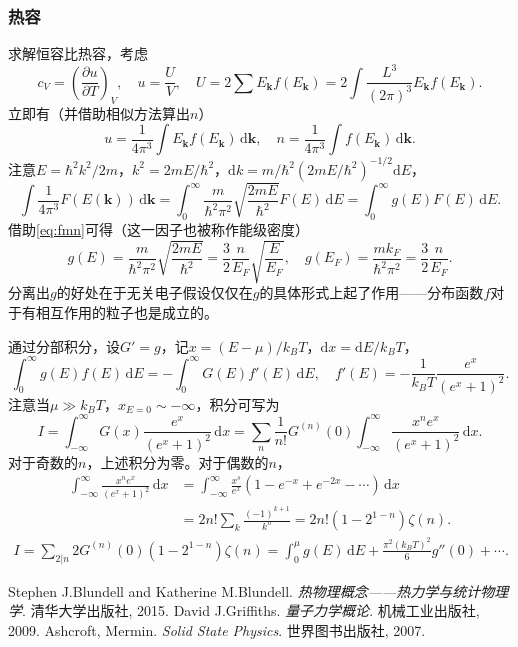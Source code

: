 \documentclass{ctexart}
\newcommand{\ddelon}[2]{\frac{\partial #1}{\partial #2}}
\newcommand{\rd}[1]{\mathrm{d} #1}
\newcommand{\pare}[1]{\left( #1 \right)}
\newcommand{\rec}[1]{\frac{1}{#1}}
\newcommand{\vk}{\boldsymbol{k}}
\newcommand{\fconclu}{\boxed}
\newcommand{\intn}[2]{\int #1 \,\mathrm{d} #2}
\newcommand{\intu}[3]{\int_0^{#1} #2 \,\mathrm{d} #3}
\newcommand{\intui}[2]{\int_0^{\infty} #1 \,\mathrm{d} #2}
\newcommand{\intii}[2]{\int_{-\infty}^{\infty} #1 \,\mathrm{d} #2}
\newcommand{\dn}[2]{#1^{\pare{#2}}}
\begin{document}
\subsubsection{热容}
求解恒容比热容，考虑
\[ c_V = \pare{\ddelon{u}{T}}_V, \quad u=\frac{U}{V}, \quad U = 2 \sum E_{\vk}f\pare{E_{\vk}}= 2 \int \frac{L^3}{\pare{2\pi}^3} E_{\vk}f\pare{E_{\vk}}. \]
立即有（并借助相似方法算出$n$）
\[ u = \rec{4\pi^3}\intn{E_{\vk}f\pare{E_{\vk}}}{\vk}, \quad n = \rec{4\pi^3}\intn{f\pare{E_{\vk}}}{\vk}. \]
注意$E=\hbar^2 k^2/2m$，$k^2=2mE/\hbar^2$，$\rd k = m/\hbar^2\pare{2mE/\hbar^2}^{-1/2}\rd E$，
\[ \intn{\rec{4\pi^3}F\pare{E\pare{\vk}}}{\vk} = \intu{\infty}{\frac{m}{\hbar^2\pi^2}\sqrt{\frac{2mE}{\hbar^2}}F\pare{E}}{E} = \intu{\infty}{g\pare{E}F\pare{E}}{E}. \]
借助\eqref{eq:fmn}可得（这一因子也被称作能级密度）
\[ g\pare{E} = \frac{m}{\hbar^2\pi^2}\sqrt{\frac{2mE}{\hbar^2}} = \frac{3}{2}\frac{n}{E_F}\sqrt{\frac{E}{E_F}},\quad \fconclu{ g\pare{E_F} = \frac{mk_F}{\hbar^2\pi^2} = \frac{3}{2}\frac{n}{E_F}. }  \]
分离出$g$的好处在于无关电子假设仅仅在$g$的具体形式上起了作用——分布函数$f$对于有相互作用的粒子也是成立的。
\par
通过分部积分，设$G'=g$，记$x=\pare{E-\mu}/k_BT$，$\rd x = \rd E/k_BT$，
\[ \intu{\infty}{g\pare{E}f\pare{E}}{E} = -\intui{G\pare{E}f'\pare{E}}{E},\quad f'\pare{E} = -\frac{1}{k_BT}\frac{e^x}{\pare{e^x+1}^2}. \]
注意当$\mu\gg k_BT$，$x_{E=0}\sim-\infty$，积分可写为
\[ I = \intii{G\pare{x}\frac{e^x}{\pare{e^x+1}^2}}{x} = \sum_n \rec{n!}\dn{G}{n}\pare{0}\intii{\frac{x^ne^x}{\pare{e^x+1}^2}}{x}. \]
对于奇数的$n$，上述积分为零。对于偶数的$n$，
\begin{align*}
\intii{\frac{x^ne^x}{\pare{e^x+1}^2}}{x} &= \intii{\frac{x^s}{e^x}\pare{1-e^{-x}+e^{-2x}-\cdots}}{x} \\
&= 2n!\sum_k\frac{\pare{-1}^{k+1}}{k^n} = 2n!\pare{1-2^{1-n}}\zeta\pare{n}.
\end{align*}
\begin{align*}
I = \sum_{2|n} 2\dn{G}{n}\pare{0}\pare{1-2^{1-n}}\zeta\pare{n} = \intu{\mu}{g\pare{E}}{E} + \frac{\pi^2\pare{k_BT}^2}{6}g''\pare{0}+\cdots.
\end{align*}

\newpage
\begin{thebibliography}{9}
Stephen J.Blundell and Katherine M.Blundell.
\textit{热物理概念——热力学与统计物理学}. 
清华大学出版社, 2015.
David J.Griffiths.
\textit{量子力学概论}. 
机械工业出版社, 2009.
Ashcroft, Mermin.
\textit{Solid State Physics}. 
世界图书出版社, 2007.
\end{thebibliography}
\end{document}
